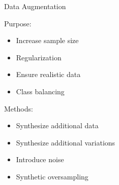 \documentclass[ignorenonframetext,xcolor=x11names]{beamer}
\begin{document}
\begin{frame}{Data Augmentation}

\begin{block}{Purpose:}
\begin{itemize}
   \item Increase sample size
   \item Regularization
   \item Ensure realistic data
   \item Class balancing
\end{itemize}
\end{block}

\begin{block}{Methods:}
\begin{itemize}
     \item Synthesize additional data
     \item Synthesize additional variations
     \item Introduce noise
     \item Synthetic oversampling
\end{itemize}
\end{block}
\end{frame}
\end{document}
